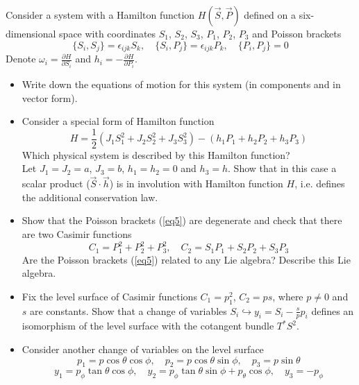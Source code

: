 \documentclass[12pt]{article}
\theoremstyle{definition}
\begin{document}
\begin{enumerate}
    Consider a system with a Hamilton function $H(\Vec{S},\Vec{P})$ defined on a six-dimensional space with coordinates $S_1$, $S_2$, $S_3$, $P_1$, $P_2$, $P_3$ and Poisson brackets
    \begin{equation}\label{eq5}
        \{S_i,S_j\}=\epsilon_{ijk}S_k,\quad \{S_i,P_j\}=\epsilon_{ijk}P_k,\quad \{P_i,P_j\}=0
    \end{equation}
    Denote $\omega_i=\frac{\partial H}{\partial S_i}$ and $h_i=-\frac{\partial H}{\partial P_i}$.
    \begin{itemize}
        \item Write down the equations of motion for this system (in components and in vector form).
        \item Consider a special form of Hamilton function
        \begin{equation}
            H=\frac{1}{2}(J_1S_1^2+J_2S_2^2+J_3S_3^2)-(h_1P_1+h_2P_2+h_3P_3)
        \end{equation}
        Which physical system is described by this Hamilton function?\\
        Let $J_1=J_2=a$, $J_3=b$, $h_1=h_2=0$ and $h_3=h$. Show that in this case a scalar product ($\Vec{S}\cdot\Vec{h}$) is in involution with Hamilton function $H$, i.e. defines the additional conservation law.
        \item Show that the Poisson brackets (\ref{eq5}) are degenerate and check that there are two Casimir functions
        \begin{equation}
            C_1=P_1^2+P_2^2+P_3^2,\quad C_2=S_1P_1+S_2P_2+S_3P_3
        \end{equation}
        Are the Poisson brackets (\ref{eq5}) related to any Lie algebra? Describe this Lie algebra.
        \item Fix the level surface of Casimir functions $C_1=p_1^2$, $C_2=ps$, where $p\neq0$ and $s$ are constants. Show that a change of variables $S_i\hookrightarrow y_i=S_i-\frac{s}{p}p_i$ defines an isomorphism of the level surface with the cotangent bundle $T^*S^2$.
        \item Consider another change of variables on the level surface
        \begin{equation}
            p_1=p\cos\theta\cos\phi,\quad p_2=p\cos\theta\sin\phi,\quad p_3=p\sin\theta
        \end{equation}
        \begin{equation}
            y_1=p_\phi\tan\theta\cos\phi,\quad y_2=p_\phi\tan\theta\sin\phi+p_\theta\cos\phi,\quad y_3=-p_\phi

\end{equation}
\end{itemize}
\end{enumerate}
\end{document}
